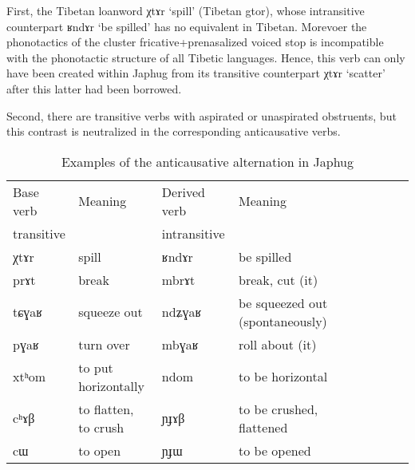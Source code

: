 \documentclass[oldfontcommands,oneside,a4paper,11pt]{article}
\newcommand{\ipa}[1]{{\phon \mbox{#1}}} %
\begin{document}
First, the Tibetan loanword \ipa{χtɤr} `spill' (Tibetan \ipa{gtor}), whose intransitive counterpart  \ipa{ʁndɤr} `be spilled' has no equivalent in Tibetan. Morevoer the phonotactics of the cluster fricative+prenasalized voiced stop is incompatible with the phonotactic structure of all Tibetic languages. Hence, this verb can only have been created within Japhug from its transitive counterpart \ipa{χtɤr} `scatter' after this latter had been borrowed.

Second, there are transitive verbs with aspirated or unaspirated obstruents, but this contrast is neutralized in the corresponding anticausative verbs.


 \begin{table}[h]
\caption{Examples of the anticausative alternation in Japhug}\label{tab:anticausative} \centering
\begin{tabular}{lllllllll} \toprule
Base   verb &Meaning &Derived verb &Meaning \\
transitive & &intransitive\\
\midrule
   \ipa{χtɤr} & spill & \ipa{ʁndɤr} & be spilled \\
      \ipa{prɤt} & break & \ipa{mbrɤt} & break, cut (it) \\
   \ipa{tɕɣaʁ} & squeeze out & \ipa{ndʑɣaʁ} & be squeezed out (spontaneously) \\
   \ipa{pɣaʁ} & turn over &    \ipa{mbɣaʁ} & roll about (it) \\
     \ipa{xtʰom}  &	 to put horizontally	&		\ipa{ndom}  &	 	to be horizontal 	\\
   \ipa{cʰɤβ}  &	 to flatten, to crush 	&		\ipa{ɲɟɤβ}  &	to be crushed, flattened 	 	\\ 
   \ipa{cɯ}  &	 to open 	&		\ipa{ɲɟɯ}  &	 to be opened	 	\\ 
\bottomrule
\end{tabular}
\end{table}
\end{document}

